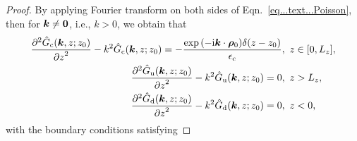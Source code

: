 \begin{proof}
    By applying Fourier transform on both sides of Eqn.~\eqref{eq...text...Poisson},
 then for $\bm{k}\neq \bm{0}$, i.e., $k>0$, we obtain that
    \begin{equation*} 
        \begin{split}
            \frac{\partial^2 \Hat{G}_{\mathrm{c}}(\bm{k}, z; z_0)}{{\partial z}^2} - k^2 \Hat{G}_{\mathrm{c}}(\bm{k}, z; z_0) = - \frac{ \exp{(-\mathrm{i} \boldsymbol{k} \cdot \boldsymbol{\rho}_0)}\delta (z- z_0)}{\epsilon_{\mathrm{c}}}&,~z \in [0, L_z],\\
            \frac{\partial^2 \hat{G}_{\mathrm{u}}(\bm{k}, z; z_0)}{{\partial z}^2} - k^2 \hat{G}_{\mathrm{u}}(\bm{k}, z; z_0) = 0&,~z > L_z,\\
            \frac{\partial^2 \hat{G}_{\mathrm{d}}(\bm{k}, z; z_0)}{{\partial z}^2} - k^2 \hat{G}_{\mathrm{d}}(\bm{k}, z; z_0) = 0&,~z < 0,
        \end{split}
    \end{equation*}
    with the boundary conditions satisfying

\end{proof}
